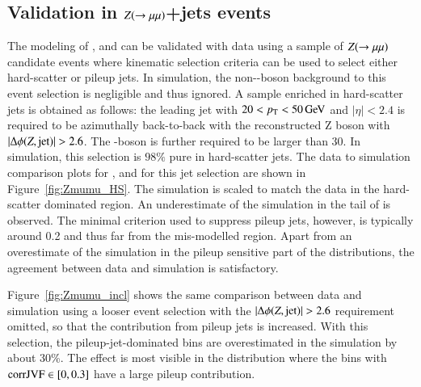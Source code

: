 \documentclass{atlasnote}
\begin{document}
\subsection{Validation in $Z(\rightarrow\mu\mu)$+jets events}
The modeling of  \RpT, \cJVF and \JVT can be validated with data using a sample of $Z(\rightarrow\mu\mu)$ candidate  events where kinematic selection criteria
can be used to select either hard-scatter or pileup jets. In simulation, the non-\Zboson-boson background to this event selection is negligible and thus ignored. 
A sample enriched in hard-scatter jets is obtained as follows:
the leading jet with 
$20 < p_{\mathrm{T}} < 50 \,\text{Ge\hspace{-.08em}V}$ and $|\eta|<2.4$ is required to be azimuthally
back-to-back with the reconstructed Z boson with $|\Delta \phi(\Zboson, {\rm jet})|>2.6$. 
The \Zboson-boson \pT is further
required to be larger than 30\GeV. In simulation, this selection is $98\%$ pure in hard-scatter jets. The data to simulation comparison plots for \RpT, \cJVF and \JVT for this jet selection are 
shown in Figure~\ref{fig:Zmumu_HS}. 
The simulation is scaled to match the data in the hard-scatter dominated region.
An underestimate of the simulation in the tail of \RpT is observed. 
The minimal \RpT criterion used to suppress pileup jets, however, is typically around 0.2 and thus far from the mis-modelled region. 
Apart from an overestimate of the simulation in the pileup sensitive part of the distributions, the agreement between data and simulation is satisfactory. 




Figure~\ref{fig:Zmumu_incl} shows the same comparison between data and simulation using a looser event selection with 
the $|\Delta \phi(\Zboson, {\rm jet})|>2.6$ requirement omitted, 
so that the contribution from pileup jets is increased.
With this selection, the pileup-jet-dominated bins 
are overestimated in the simulation by about 30\%. The effect is most visible in the \cJVF distribution where the bins with
${\rm corrJVF} \in [0,0.3]$ have a large pileup contribution. 
\end{document}

